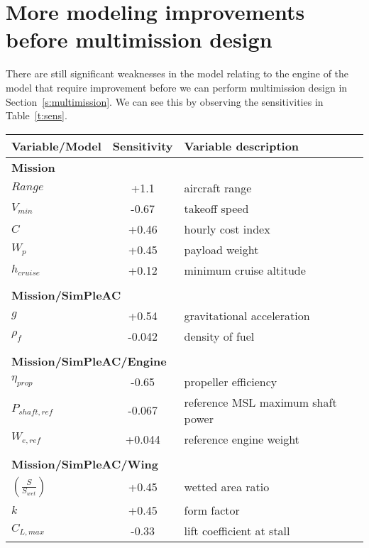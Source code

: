 \section{More modeling improvements before multimission design}

There are still significant weaknesses in the model relating to the engine of the model that require
improvement before we can perform multimission design in Section~\ref{s:multimission}.
We can see this by observing the sensitivities in Table~\ref{t:sens}.

    \begin{table}
        \footnotesize
        \centering
        \begin{tabular}{l c l}
            \toprule
            Variable/Model & Sensitivity & Variable description \\ \midrule
            \multicolumn{3}{l}{\textbf{Mission}} \\
            $Range$ & +1.1 & aircraft range \\
            $V_{min}$ & -0.67 & takeoff speed \\
            $C$ & +0.46 & hourly cost index \\
            $W_p$ & +0.45 & payload weight \\
            $h_{cruise}$ & +0.12 & minimum cruise altitude \\
            & & \\
            \multicolumn{3}{l}{\textbf{Mission/SimPleAC}} \\
            $g$ & +0.54 & gravitational acceleration \\
            $\rho_f$ & -0.042 & density of fuel \\
            & & \\
            \multicolumn{3}{l}{\textbf{Mission/SimPleAC/Engine}} \\
            $\eta_{prop}$ & -0.65 & propeller efficiency \\
            $P_{shaft,ref}$ & -0.067 & reference MSL maximum shaft power \\
            $W_{e,ref}$ & +0.044 & reference engine weight \\
            & & \\
            \multicolumn{3}{l}{\textbf{Mission/SimPleAC/Wing}} \\
            $(\frac{S}{S_{wet}})$ & +0.45 & wetted area ratio \\
            $k$ & +0.45 & form factor \\
            $C_{L,max}$ & -0.33 & lift coefficient at stall \\

\end{tabular}
\end{table}
